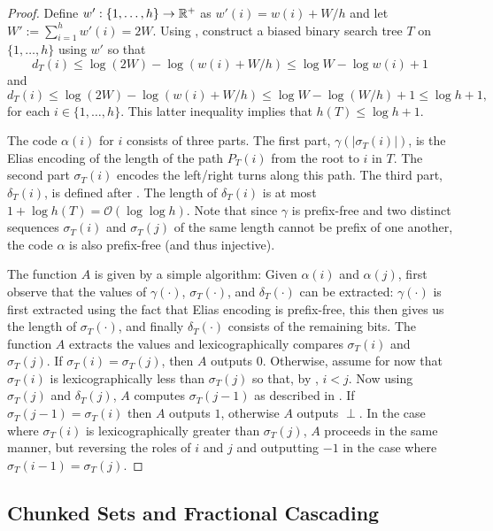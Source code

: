 \documentclass[kpfonts]{patmorin}
\newcommand{\Oh}{\mathcal{O}}
\let\le\leqslant
\begin{document}
\begin{proof}
  Define $w':\{1,\ldots,h\}\to \mathbb{R}^+$ as $w'(i)=w(i)+W/h$ and let $W':=\sum_{i=1}^h w'(i)=2W$.
  Using , construct a biased binary search tree $T$ on $\{1,\ldots,h\}$ using $w'$ so that
  \[
    d_T(i)\le\log (2W)-\log(w(i)+W/h) \le \log W-\log w(i)+1
  \]
  and
  \[
  d_T(i)\le\log (2W)-\log(w(i)+W/h) \le \log W-\log (W/h)+1 \le \log h + 1,
  \]
  for each $i\in\{1,\ldots,h\}$.  This latter inequality implies that $h(T)\le\log h + 1$.

  The code $\alpha(i)$ for $i$ consists of three parts.  The first part, $\gamma(|\sigma_T(i)|)$, is the Elias encoding of the length of the path $P_T(i)$ from the root to $i$ in $T$. The second part $\sigma_T(i)$ encodes the left/right turns along this path. The third part, $\delta_T(i)$, is defined after .
  The length of $\delta_T(i)$ is at most $1+\log h(T)=\Oh(\log\log h)$. Note that since $\gamma$ is prefix-free and two distinct sequences $\sigma_T(i)$ and $\sigma_T(j)$ of the same length cannot be prefix of one another, the code $\alpha$ is also prefix-free (and thus injective).

  The function $A$ is given by a simple algorithm: Given $\alpha(i)$ and $\alpha(j)$, first observe that the values of $\gamma(\cdot)$, $\sigma_T(\cdot)$, and $\delta_T(\cdot)$ can be extracted: $\gamma(\cdot)$ is first extracted using the fact that Elias encoding is prefix-free, this then gives us the length of $\sigma_T(\cdot)$, and finally $\delta_T(\cdot)$ consists of the remaining bits.
   The function $A$ extracts the values and lexicographically compares $\sigma_T(i)$ and $\sigma_T(j)$.  If $\sigma_T(i)=\sigma_T(j)$, then $A$ outputs $0$.
   Otherwise, assume for now that $\sigma_T(i)$ is lexicographically less than $\sigma_T(j)$ so that, by , $i < j$.  Now using $\sigma_T(j)$ and $\delta_T(j)$, $A$ computes $\sigma_T(j-1)$ as described in .
   If $\sigma_T(j-1)=\sigma_T(i)$ then $A$ outputs $1$, otherwise $A$ outputs $\perp$.
  In the case where $\sigma_T(i)$ is lexicographically greater than $\sigma_T(j)$, $A$ proceeds in the same manner, but reversing the roles of $i$ and $j$ and outputting $-1$ in the case where $\sigma_T(i-1)=\sigma_T(j)$.
\end{proof}

\subsection{Chunked Sets and Fractional Cascading}
\end{document}
